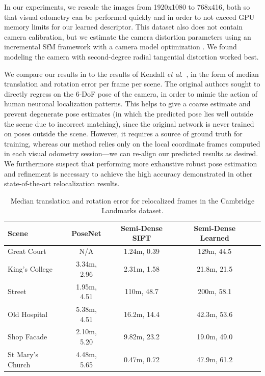 In our experiments, we rescale the images from 1920x1080 to 768x416, both so that visual odometry can be performed quickly and in order to not exceed GPU memory limits for our learned descriptor. This dataset also does not contain camera calibration, but we estimate the camera distortion parameters using an incremental SfM framework with a camera model optimization \cite{schoenberger2016sfm} \cite{schoenberger2016mvs} \cite{schoenberger2016vote}. We found modeling the camera with second-degree radial tangential distortion worked best.

We compare our results in  to the results of Kendall \textit{et al}.\ \cite{kendall2015posenet}, in the form of median translation and rotation error per frame per scene. The original authors sought to directly regress on the 6-DoF pose of the camera, in order to mimic the action of human neuronal localization patterns. This helps to give a coarse estimate and prevent degenerate pose estimates (in which the predicted pose lies well outside the scene due to incorrect matching), since the original network is never trained on poses outside the scene. However, it requires a source of ground truth for training, whereas our method relies only on the local coordinate frames computed in each visual odometry session---we can re-align our predicted results as desired. We furthermore suspect that performing more exhaustive robust pose estimation and refinement is necessary to achieve the high accuracy demonstrated in other state-of-the-art relocalization results.

\begin{table}[h]
	\begin{tabular} { l | c c c c}
		Scene & PoseNet \cite{kendall2015posenet} & Semi-Dense SIFT & Semi-Dense Learned \\
		\hline
		Great Court      & N/A                    & 1.24m, 0.39\textdegree & 129m, 44.5\textdegree \\
		King's College   & 3.34m, 2.96\textdegree & 2.31m, 1.58\textdegree & 21.8m, 21.5\textdegree \\
		Street           & 1.95m, 4.51\textdegree & 110m, 48.7\textdegree  & 200m, 58.1\textdegree \\
		Old Hospital     & 5.38m, 4.51\textdegree & 16.2m, 14.4\textdegree & 42.3m, 53.6\textdegree \\
		Shop Facade      & 2.10m, 5.20\textdegree & 9.82m, 23.2\textdegree & 19.0m, 49.0\textdegree \\
		St Mary's Church & 4.48m, 5.65\textdegree & 0.47m, 0.72\textdegree & 47.9m, 61.2\textdegree \\
	\end{tabular}
	\caption{Median translation and rotation error for relocalized frames in the Cambridge Landmarks dataset.}
	\label{tab:cambridge-reloc}
\end{table}

\cleardoublepage

